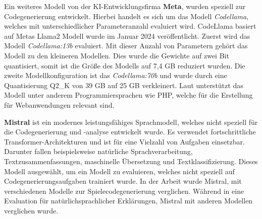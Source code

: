 Ein weiteres Modell von der KI-Entwicklungsfirma \textbf{Meta}, wurden speziell zur Codegenerierung entwickelt. Hierbei handelt es sich um das Modell \textit{Codellama}, welches mit unterschiedlicher Parameteranzahl evaluiert wird. CodeLlama basiert auf Metas Llama2 Modell wurde im Januar 2024 veröffentlicht.
Zuerst wird das Modell \textit{Codellama:13b} evaluiert. Mit dieser Anzahl von Parametern gehört das Modell zu den kleineren Modellen. Dies wurde die Gewichte auf zwei Bit quantisiert, somit ist die Größe des Modells auf 7,4 GB reduziert wurden.
Die zweite Modellkonfiguration ist das \textit{Codellama:70b} und wurde durch eine Quantisierung Q2\_K von 39 GB auf 25 GB verkleinert. Laut \cite{meta-2023} unterstützt das Modell unter anderem Programmiersprachen wie PHP, welche für die Erstellung für Webanwendungen relevant sind.\vspace{0.2cm}

\textbf{Mistral} ist ein modernes leistungsfähiges Sprachmodell, welches nicht speziell für die Codegenerierung und -analyse entwickelt wurde. Es verwendet fortschrittliche Transformer-Architekturen und ist für eine Vielzahl von Aufgaben einsetzbar. Darunter fallen beispielsweise natürliche Sprachverarbeitung, Textzusammenfassungen, maschinelle Übersetzung und Textklassifizierung. Dieses Modell ausgewählt, um ein Modell zu evaluieren, welches nicht speziell auf Codegenerierungsaufgaben trainiert wurde. In der Arbeit \cite{eberhardinger-2024} wurde Mistral, mit verschiedenen Modelle zur Spielecodegenerierung verglichen. Während in \cite{quan-2024} eine Evaluation für natürlichsprachlicher Erklärungen, Mistral mit anderen Modellen verglichen wurde.\vspace{0.2cm}



